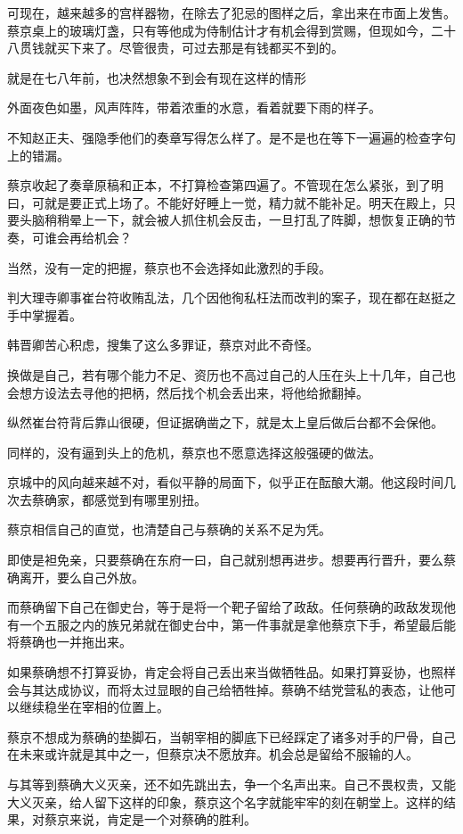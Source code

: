 可现在，越来越多的宫样器物，在除去了犯忌的图样之后，拿出来在市面上发售。蔡京桌上的玻璃灯盏，只有等他成为侍制估计才有机会得到赏赐，但现如今，二十八贯钱就买下来了。尽管很贵，可过去那是有钱都买不到的。

就是在七八年前，也决然想象不到会有现在这样的情形

外面夜色如墨，风声阵阵，带着浓重的水意，看着就要下雨的样子。

不知赵正夫、强隐季他们的奏章写得怎么样了。是不是也在等下一遍遍的检查字句上的错漏。

蔡京收起了奏章原稿和正本，不打算检查第四遍了。不管现在怎么紧张，到了明曰，可就是要正式上场了。不能好好睡上一觉，精力就不能补足。明天在殿上，只要头脑稍稍晕上一下，就会被人抓住机会反击，一旦打乱了阵脚，想恢复正确的节奏，可谁会再给机会？

当然，没有一定的把握，蔡京也不会选择如此激烈的手段。

判大理寺卿事崔台符收贿乱法，几个因他徇私枉法而改判的案子，现在都在赵挺之手中掌握着。

韩晋卿苦心积虑，搜集了这么多罪证，蔡京对此不奇怪。

换做是自己，若有哪个能力不足、资历也不高过自己的人压在头上十几年，自己也会想方设法去寻他的把柄，然后找个机会丢出来，将他给掀翻掉。

纵然崔台符背后靠山很硬，但证据确凿之下，就是太上皇后做后台都不会保他。

同样的，没有逼到头上的危机，蔡京也不愿意选择这般强硬的做法。

京城中的风向越来越不对，看似平静的局面下，似乎正在酝酿大潮。他这段时间几次去蔡确家，都感觉到有哪里别扭。

蔡京相信自己的直觉，也清楚自己与蔡确的关系不足为凭。

即使是袒免亲，只要蔡确在东府一曰，自己就别想再进步。想要再行晋升，要么蔡确离开，要么自己外放。

而蔡确留下自己在御史台，等于是将一个靶子留给了政敌。任何蔡确的政敌发现他有一个五服之内的族兄弟就在御史台中，第一件事就是拿他蔡京下手，希望最后能将蔡确也一并拖出来。

如果蔡确想不打算妥协，肯定会将自己丢出来当做牺牲品。如果打算妥协，也照样会与其达成协议，而将太过显眼的自己给牺牲掉。蔡确不结党营私的表态，让他可以继续稳坐在宰相的位置上。

蔡京不想成为蔡确的垫脚石，当朝宰相的脚底下已经踩定了诸多对手的尸骨，自己在未来或许就是其中之一，但蔡京决不愿放弃。机会总是留给不服输的人。

与其等到蔡确大义灭亲，还不如先跳出去，争一个名声出来。自己不畏权贵，又能大义灭亲，给人留下这样的印象，蔡京这个名字就能牢牢的刻在朝堂上。这样的结果，对蔡京来说，肯定是一个对蔡确的胜利。

